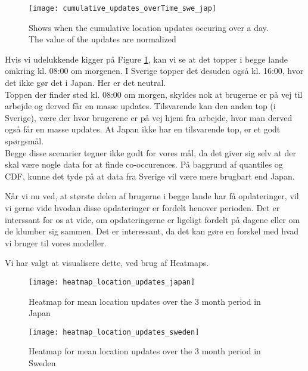 \begin{figure}[H]
    \hspace*{-1.8cm}
    \centering
    \texttt{[image: cumulative\_updates\_overTime\_swe\_jap]}
    \caption{Shows when the cumulative location updates occuring over a day. The value of the updates are normalized}
    \label{fig:cumu_loc_time_jap_swe}
\end{figure}

Hvis vi udelukkende kigger på Figure \ref{fig:cumu_loc_time_jap_swe}, kan vi se at det topper i begge lande omkring kl. 08:00 om morgenen. I Sverige topper det desuden også kl. 16:00, hvor det ikke gør det i Japan. Her er det neutral. \\
Toppen der finder sted kl. 08:00 om morgen, skyldes nok at brugerne er på vej til arbejde og derved får en masse updates. Tilsvarende kan den anden top (i Sverige), være der hvor brugerene er på vej hjem fra arbejde, hvor man derved også får en masse updates. At Japan ikke har en tilsvarende top, er et godt spørgsmål. \\




Begge disse scenarier tegner ikke godt for vores mål, da det giver sig selv at der skal være nogle data for at finde co-occurences. 
På baggrund af quantiles og CDF, kunne det tyde på at data fra Sverige vil være mere brugbart end Japan. 

Når vi nu ved, at største delen af brugerne i begge lande har få opdateringer, vil vi gerne vide hvodan disse opdateringer er fordelt henover perioden. Det er interssant for os at vide, om opdateringerne er ligeligt fordelt på dagene eller om de klumber sig sammen. Det er interessant, da det kan gøre en forskel med hvad vi bruger til vores modeller. 

Vi har valgt at visualisere dette, ved brug af Heatmaps. 

\newpage


\begin{figure}[H]
    \hspace*{-1.5cm}
    \centering
    \texttt{[image: heatmap\_location\_updates\_japan]}
    \caption{Heatmap for mean location updates over the 3 month period in Japan}
    \label{fig:heatmap_jap}
\end{figure}
\begin{figure}[H]
    \hspace*{-1.5cm}
    \centering
    \texttt{[image: heatmap\_location\_updates\_sweden]}
    \caption{Heatmap for mean location updates over the 3 month period in Sweden}
    \label{fig:heatmap_swe}
\end{figure}



